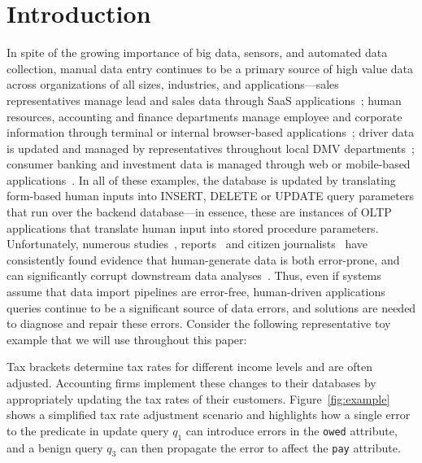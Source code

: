 \section{Introduction}

\label{s:intro}


In spite of the growing importance of big data, sensors, and automated data collection, manual data entry continues to be a primary source of high value data across organizations of all sizes, industries, and applications---sales representatives manage lead and sales data through SaaS applications~\cite{salesforce}; human resources, accounting and finance departments manage employee and corporate information through terminal or internal browser-based applications~\cite{sap}; driver data is updated and managed by representatives throughout local DMV departments~\cite{dmv,dmvsystem};  consumer banking and investment data is managed through web or mobile-based applications~\cite{betterment,chase}.  In all of these examples, the database is updated by translating form-based human inputs into INSERT, DELETE or UPDATE query parameters that run over the backend database---in essence, these are instances of OLTP applications that translate human input into stored procedure parameters.  Unfortunately, numerous studies~\cite{kandel2012,krishnan2016hilda,Barchard20111834}, reports~\cite{citibank,Yates10,Grady13,Robeznieks05} and citizen journalists~\cite{iquantnyc} have consistently found evidence that human-generate data is both error-prone, and can significantly corrupt downstream data analyses~\cite{iquantnycnypd}.  Thus, even if systems assume that data import pipelines are error-free, human-driven applications queries continue to be a significant source of data errors, and solutions are needed to diagnose and repair these errors.  Consider the following representative toy example that we will use throughout this paper:

\begin{example}\label{ex:taxes}
Tax brackets determine tax rates for different income levels and are often adjusted. Accounting firms implement these changes to their databases by appropriately updating the tax rates of their customers.  Figure~\ref{fig:example} shows a simplified tax rate adjustment scenario and highlights how a single error to the predicate in update query $q_1$ can introduce errors in the \texttt{owed} attribute, and a benign query $q_3$ can then propagate the error to affect the \texttt{pay} attribute.
\end{example}

